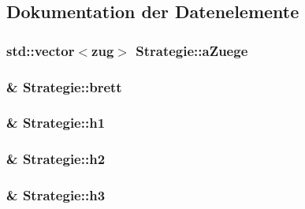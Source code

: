 \subsection{Dokumentation der Datenelemente}
\hypertarget{class_strategie_a6d800c6d8636540d16b41d7abf8c9ad3}{}
\subsubsection[{a\+Zuege}]{\setlength{\rightskip}{0pt plus 5cm}std\+::vector$<${\bf zug}$>$ Strategie\+::a\+Zuege\hspace{0.3cm}{\ttfamily [protected]}}\label{class_strategie_a6d800c6d8636540d16b41d7abf8c9ad3}
\hypertarget{class_strategie_a2a498380f5a837cd9e5afdd9b546ed46}{}
\subsubsection[{brett}]{\& Strategie\+::brett\hspace{0.3cm}{\ttfamily [protected]}}\label{class_strategie_a2a498380f5a837cd9e5afdd9b546ed46}
\hypertarget{class_strategie_a0b64b5969f835653965957eab7f1f5a9}{}
\subsubsection[{h1}]{\& Strategie\+::h1\hspace{0.3cm}{\ttfamily [protected]}}\label{class_strategie_a0b64b5969f835653965957eab7f1f5a9}
\hypertarget{class_strategie_a6721c42de183333c6f49fe9724b907ae}{}
\subsubsection[{h2}]{ \& Strategie\+::h2\hspace{0.3cm}{\ttfamily [protected]}}\label{class_strategie_a6721c42de183333c6f49fe9724b907ae}
\hypertarget{class_strategie_a82f2549dabdf1afbe888405d1adfb9e6}{}
\subsubsection[{h3}]{ \& Strategie\+::h3\hspace{0.3cm}{\ttfamily [protected]}}\label{class_strategie_a82f2549dabdf1afbe888405d1adfb9e6}
\hypertarget{class_strategie_abbf970c05c0033ae9f5df3766316846c}{}
